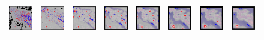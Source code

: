 \documentclass{itatnew}
\begin{document}
\begin{figure}[htp]
\begin{tabular}{cccccccc}
    \includegraphics[width=4.6em]{images/gen-demo-zoom-focalgstar-1}&
    \includegraphics[width=4.6em]{images/gen-demo-zoom-focalgstar-2}&
    \includegraphics[width=4.6em]{images/gen-demo-zoom-focalgstar-3}&
    \includegraphics[width=4.6em]{images/gen-demo-zoom-focalgstar-4}&
    \includegraphics[width=4.6em]{images/gen-demo-zoom-focalgstar-5}&
    \includegraphics[width=4.6em]{images/gen-demo-zoom-focalgstar-6}&
    \includegraphics[width=4.6em]{images/gen-demo-zoom-focalgstar-7}&
    \includegraphics[width=4.6em]{images/gen-demo-zoom-focalgstar-8}\\
  \end{tabular}
  

\end{figure}
\end{document}
